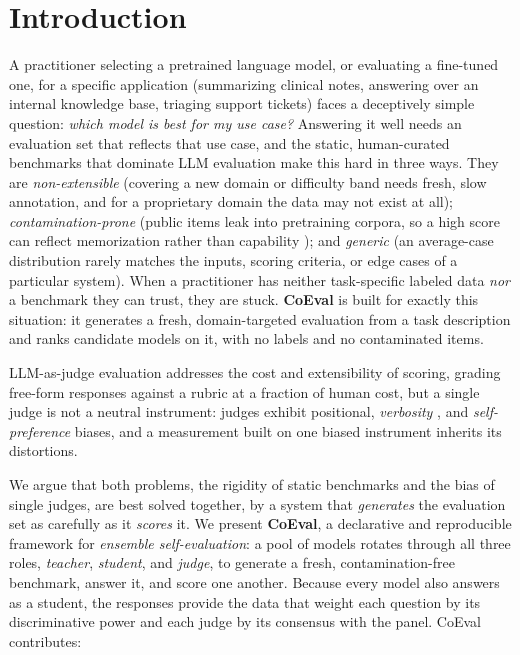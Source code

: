 \section{Introduction}\label{introduction}

A practitioner selecting a pretrained language model, or evaluating a fine-tuned one, for a specific application
(summarizing clinical notes, answering over an internal knowledge base, triaging support tickets) faces a deceptively
simple question: \emph{which model is best for my use case?} Answering it well needs an evaluation set that reflects
that use case, and the static, human-curated benchmarks that dominate LLM evaluation make this hard in three ways. They
are \emph{non-extensible} (covering a new domain or difficulty band needs fresh, slow annotation, and for a
proprietary domain the data may not exist at all); \emph{contamination-prone} (public items leak into pretraining
corpora, so a high score can reflect memorization rather than capability \citep{ref12, ref13}); and \emph{generic} (an average-case distribution rarely matches the inputs, scoring criteria,
or edge cases of a particular system). When a practitioner has neither task-specific labeled data \emph{nor} a
benchmark they can trust, they are stuck. \textbf{CoEval} is built for exactly this situation: it generates a
fresh, domain-targeted evaluation from a task description and ranks candidate models on it, with no labels and no
contaminated items.

LLM-as-judge evaluation \citep{ref1, ref2} addresses the cost and extensibility of scoring,
grading free-form responses against a rubric at a fraction of human cost, but a single judge is not a neutral
instrument: judges exhibit positional, \emph{verbosity} \citep{ref8}, and \emph{self-preference} biases,
and a measurement built on one biased instrument inherits its distortions.

We argue that both problems, the rigidity of static benchmarks and the bias of single judges, are best
solved together, by a system that \emph{generates} the evaluation set as carefully as it \emph{scores} it. We
present \textbf{CoEval}, a declarative and reproducible framework for \emph{ensemble self-evaluation}: a
pool of models rotates through all three roles, \emph{teacher}, \emph{student}, and \emph{judge}, to generate a
fresh, contamination-free benchmark, answer it, and score one another. Because every model also answers as a student,
the responses provide the data that weight each question by its discriminative power and each judge by its consensus
with the panel. CoEval contributes:

